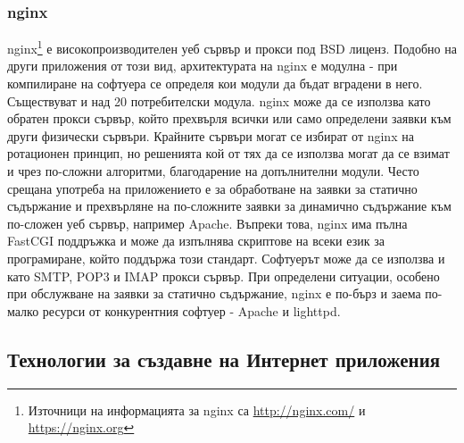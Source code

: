 \documentclass[pdftex,14pt,a4paper]{extreport}
\begin{document}
\subsubsection {nginx}
nginx\footnote{Източници на информацията за nginx са \url{http://nginx.com/} и \url{https://nginx.org}} е високопроизводителен уеб сървър и прокси под BSD лиценз. Подобно на други приложения от този вид, архитектурата на nginx е модулна - при компилиране на софтуера се определя кои модули да бъдат вградени в него. Съществуват и над 20 потребителски модула.
nginx може да се използва като обратен прокси сървър, който прехвърля всички или само определени заявки към други физически сървъри. Крайните сървъри могат се избират от nginx на ротационен принцип, но решенията кой от тях да се използва могат да се взимат и чрез по-сложни алгоритми, благодарение на допълнителни модули. Често срещана употреба на приложението е за обработване на заявки за статично съдържание и прехвърляне на по-сложните заявки за динамично съдържание към по-сложен уеб сървър, например Apache. Въпреки това, nginx има пълна FastCGI поддръжка и може да изпълнява скриптове на всеки език за програмиране, който поддържа този стандарт. Софтуерът може да се използва и като SMTP, POP3 и IMAP прокси сървър.
При определени ситуации, особено при обслужване на заявки за статично съдържание, nginx е по-бърз и заема по-малко ресурси от конкурентния софтуер - Apache и lighttpd.
\subsection {Технологии за създавне на Интернет приложения}
\end{document}
